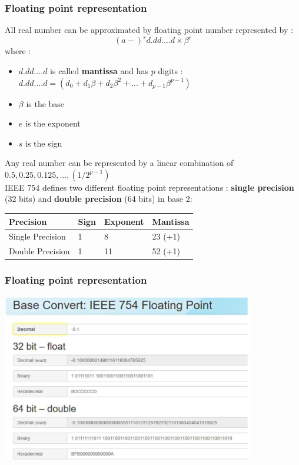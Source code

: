 \begin{frame}[containsverbatim]
\frametitle{Floating point representation}

{\footnotesize
All real number can be approximated by floating point number represented by :
$$
(a-)^s d.dd.... d \times \beta^e
$$
where :
\begin{itemize}
\item $d.dd.... d$ is called \textbf{mantissa} and has $p$ digits : $d.dd.... d =  (d_0 + d_1 \beta + d_2 \beta^2 + ... + d_{p-1} \beta^{p-1})$
\item $\beta$  is the base
\item $e$ is the exponent
\item $s$ is the sign
\end{itemize}

Any real number can be represented by a linear combination of $0.5, 0.25, 0.125, ... , (1/2^{p-1})$
\\

IEEE 754 defines two different floating point representations : \textbf{single precision} (32 bits) and \textbf{double precision} (64 bits) in base 2:

\begin{center}
\begin{table}
\begin{tabular}{|l|l|l|l|} 
\hline
\textbf{Precision} & \textbf{Sign} & \textbf{Exponent} & \textbf{Mantissa} \\
\hline
Single Precision & 1 & 8 & 23 (+1) \\
\hline
Double Precision & 1 & 11 & 52 (+1) \\
\hline
\end{tabular}
\end{table}
\end{center}
}

\end{frame}



\begin{frame}[containsverbatim]
\frametitle{Floating point representation}
\begin{center}
\includegraphics[width=11cm]{DayGilles/images/ieee754.jpg}
\end{center}
\end{frame}



